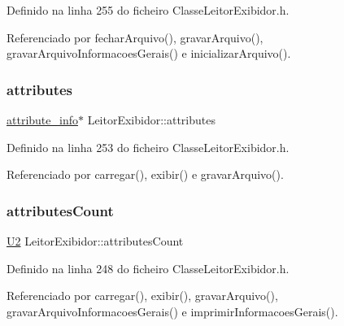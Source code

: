 Definido na linha 255 do ficheiro Classe\+Leitor\+Exibidor.\+h.



Referenciado por fechar\+Arquivo(), gravar\+Arquivo(), gravar\+Arquivo\+Informacoes\+Gerais() e inicializar\+Arquivo().

\mbox{\label{classLeitorExibidor_adb26d0959bef738b08bffa009d12fac3}} 
\subsubsection{\texorpdfstring{attributes}{attributes}}
{\footnotesize\ttfamily \hyperlink{structattribute__info}{attribute\+\_\+info}$\ast$ Leitor\+Exibidor\+::attributes\hspace{0.3cm}{\ttfamily [private]}}



Definido na linha 253 do ficheiro Classe\+Leitor\+Exibidor.\+h.



Referenciado por carregar(), exibir() e gravar\+Arquivo().

\mbox{\label{classLeitorExibidor_ac42b42a9a6c94c260db0016df94cda1d}} 
\subsubsection{\texorpdfstring{attributes\+Count}{attributesCount}}
{\footnotesize\ttfamily \hyperlink{BasicTypes_8h_a90240657108b1b457eef9d3f76e0202e}{U2} Leitor\+Exibidor\+::attributes\+Count\hspace{0.3cm}{\ttfamily [private]}}



Definido na linha 248 do ficheiro Classe\+Leitor\+Exibidor.\+h.



Referenciado por carregar(), exibir(), gravar\+Arquivo(), gravar\+Arquivo\+Informacoes\+Gerais() e imprimir\+Informacoes\+Gerais().

\mbox{\label{classLeitorExibidor_a0c4c896a1baf647a282881524f8a9687}} 
